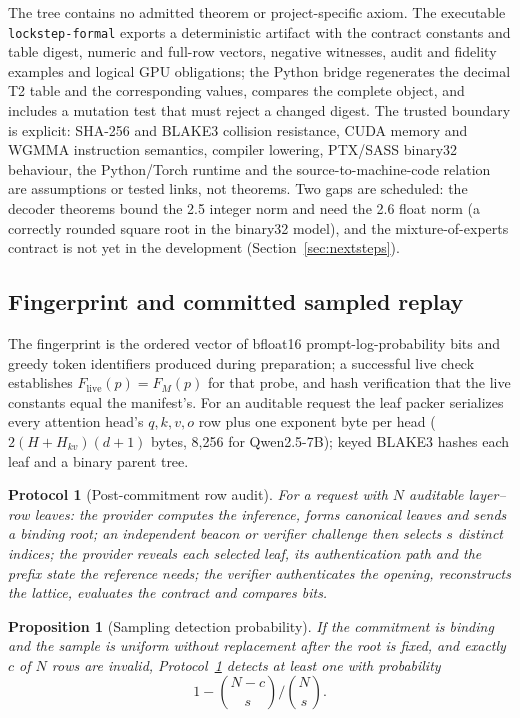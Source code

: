 \documentclass{article}
\newtheorem{Prop}[Thm]{Proposition}
\newtheorem{Prot}[Thm]{Protocol}
\begin{document}
The tree contains no admitted theorem or project-specific axiom.  The executable
\texttt{lockstep-formal} exports a deterministic artifact with the contract constants and
table digest, numeric and full-row vectors, negative witnesses, audit and fidelity examples
and logical GPU obligations; the Python bridge regenerates the decimal T2 table and the
corresponding values, compares the complete object, and includes a mutation test that must
reject a changed digest.  The trusted boundary is explicit: SHA-256 and BLAKE3 collision
resistance, CUDA memory and WGMMA instruction semantics, compiler lowering, PTX/SASS binary32
behaviour, the Python/Torch runtime and the source-to-machine-code relation are assumptions
or tested links, not theorems.  Two gaps are scheduled: the decoder theorems bound the 2.5
integer norm and need the 2.6 float norm (a correctly rounded square root in the binary32
model), and the mixture-of-experts contract is not yet in the development
(Section~\ref{sec:nextsteps}).

\subsection{Fingerprint and committed sampled replay}

The fingerprint is the ordered vector of bfloat16 prompt-log-probability bits and greedy
token identifiers produced during preparation; a successful live check establishes
$F_{\mathrm{live}}(p)=F_M(p)$ for that probe, and hash verification that the live constants
equal the manifest's.  For an auditable request the leaf packer serializes every attention
head's $q,k,v,o$ row plus one exponent byte per head ($2(H+H_{kv})(d+1)$ bytes, 8,256 for
Qwen2.5-7B); keyed BLAKE3 hashes each leaf and a binary parent tree.

\begin{Prot}[Post-commitment row audit]
\label{prot:audit}
For a request with $N$ auditable layer--row leaves: the provider computes the inference,
forms canonical leaves and sends a binding root; an independent beacon or verifier challenge
then selects $s$ distinct indices; the provider reveals each selected leaf, its
authentication path and the prefix state the reference needs; the verifier authenticates the
opening, reconstructs the lattice, evaluates the contract and compares bits.
\end{Prot}

\begin{Prop}[Sampling detection probability]
\label{prop:sampling}
If the commitment is binding and the sample is uniform without replacement after the root is
fixed, and exactly $c$ of $N$ rows are invalid, Protocol~\ref{prot:audit} detects at least one
with probability
\begin{equation}
  1-\binom{N-c}{s}\Big/\binom{N}{s}.
  \label{eq:detection}
\end{equation}
\end{Prop}
\end{document}

